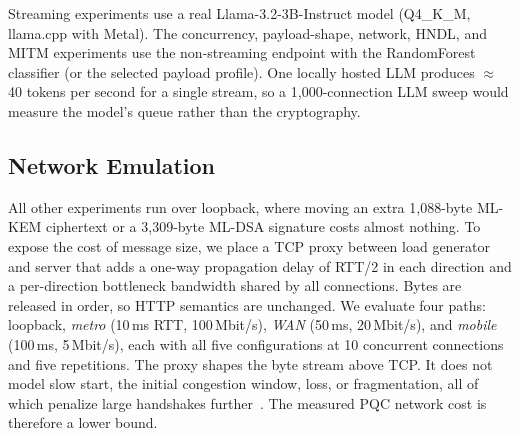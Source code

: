 Streaming experiments use a real Llama-3.2-3B-Instruct model (Q4\_K\_M, llama.cpp with Metal).
The concurrency, payload-shape, network, HNDL, and MITM experiments use the non-streaming endpoint
with the RandomForest classifier (or the selected payload profile). One locally hosted LLM produces
$\approx$40 tokens per second for a single stream, so a 1,000-connection LLM sweep would
measure the model's queue rather than the cryptography.

\subsection{Network Emulation}\label{sec:netem}
All other experiments run over loopback, where moving an extra 1,088-byte ML-KEM ciphertext or a
3,309-byte ML-DSA signature costs almost nothing. To expose the cost of message size, we place a
TCP proxy between load generator and server that adds a one-way propagation delay of RTT/2 in each
direction and a per-direction bottleneck bandwidth shared by all connections. Bytes are released
in order, so HTTP semantics are unchanged. We evaluate four paths: loopback, \emph{metro}
(10\,ms RTT, 100\,Mbit/s), \emph{WAN} (50\,ms, 20\,Mbit/s), and \emph{mobile} (100\,ms, 5\,Mbit/s),
each with all five configurations at 10 concurrent connections and five repetitions. The proxy
shapes the byte stream above TCP. It does not model slow start, the initial congestion window,
loss, or fragmentation, all of which penalize large handshakes further~\cite{paquin2020benchmarking}.
The measured PQC network cost is therefore a lower bound.

